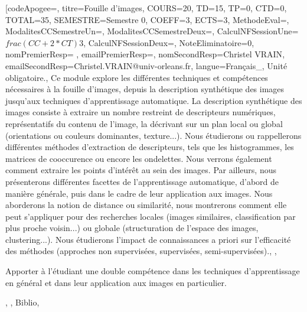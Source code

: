 \vfill


\module[codeApogee={},
titre={Fouille d'images},
COURS={20},
TD={15},
TP={0},
CTD={0},
TOTAL={35},
SEMESTRE={Semestre 0},
COEFF={3},
ECTS={3},
MethodeEval={},
ModalitesCCSemestreUn={},
ModalitesCCSemestreDeux={},
CalculNFSessionUne={$frac{(CC+2*CT)}{3}$},
CalculNFSessionDeux={},
NoteEliminatoire={0},
nomPremierResp={ },
emailPremierResp={},
nomSecondResp={Christel VRAIN},
emailSecondResp={Christel.VRAIN@univ-orleans.fr},
langue={Français_},
{Unité obligatoire.},
{Ce module explore les différentes techniques et compétences nécessaires à la fouille d'images, depuis la description synthétique des images jusqu'aux techniques d'apprentissage automatique.
La description synthétique des images consiste à extraire un nombre restreint de descripteurs numériques, représentatifs du contenu de l'image, la décrivant sur un plan local ou global (orientations ou couleurs dominantes, texture...). Nous étudierons ou rappellerons différentes méthodes d'extraction de descripteurs, tels que les histogrammes, les matrices de cooccurence ou encore les ondelettes. Nous verrons également comment extraire les points d'intérêt au sein des images.
Par ailleurs, nous présenterons différentes facettes de l'apprentissage automatique, d'abord de manière générale, puis dans le cadre de leur application aux images.
Nous aborderons la notion de distance ou similarité, nous montrerons comment elle peut s'appliquer pour des recherches locales (images similaires, classification par plus proche voisin...) ou globale (structuration de l'espace des images, clustering...).
Nous étudierons l'impact de connaissances a priori sur l'efficacité des méthodes (approches non supervisées, supervisées, semi-supervisées).},
{},
{\begin{itemize}
\ObjItem Apporter à l'étudiant une double compétence dans les techniques d'apprentissage en général et dans leur application aux images en particulier.
\end{itemize}},
{},
{Biblio},

\vfill


